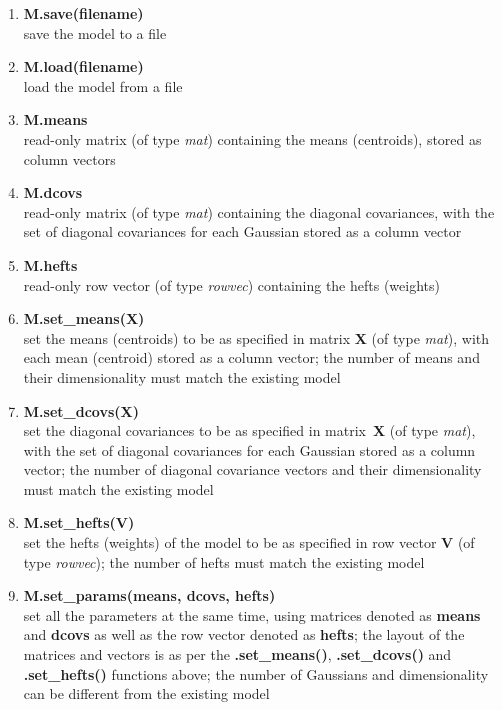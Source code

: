 \begin{enumerate}[{$\bullet$}]
\item
{\bf M.save(filename)}\\
save the model to a file

\item
{\bf M.load(filename)}\\
load the model from a file

\item
{\bf M.means}\\
read-only matrix (of type {\it mat}) containing the means (centroids), stored as column vectors

\item
{\bf M.dcovs}\\
read-only matrix (of type {\it mat}) containing the diagonal covariances, with the set of diagonal covariances for each Gaussian stored as a column vector

\item
{\bf M.hefts}\\
read-only row vector (of type {\it rowvec}) containing the hefts (weights)

\item
{\bf M.set\_means(X)}\\
set the means (centroids) to be as specified in matrix {\bf X} (of type {\it mat}), with each mean (centroid) stored as a column vector;
the number of means and their dimensionality must match the existing model

\item
{\bf M.set\_dcovs(X)}\\
set the diagonal covariances to be as specified in matrix~{\bf X} (of type {\it mat}), with the set of diagonal covariances for each Gaussian stored as a column vector;
the number of diagonal covariance vectors and their dimensionality must match the existing model

\item
{\bf M.set\_hefts(V)}\\
set the hefts (weights) of the model to be as specified in row vector {\bf V} (of type {\it rowvec});
the number of hefts must match the existing model

\item
{\bf M.set\_params(means, dcovs, hefts)}\\
set all the parameters at the same time, using matrices denoted as {\bf means} and {\bf dcovs} as well as the row vector denoted as {\bf hefts};
the layout of the matrices and vectors is as per the {\bf .set\_means()}, {\bf .set\_dcovs()} and {\bf .set\_hefts()} functions above;
the number of Gaussians and dimensionality can be different from the existing model

\end{enumerate}

